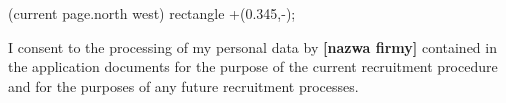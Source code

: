 \documentclass[9pt]{juniordevcv} %
\begin{document}
      (current page.north west) rectangle +(0.345\paperwidth,-\paperheight);
    \begin{minipage}[t]{.27\textwidth}
        
    \end{minipage}
    \hfill
    \begin{minipage}[t]{.67\textwidth}
        
    \end{minipage}

    \vspace{-26pt}
    \vspace{4pt}

    {\small%
        \noindent I consent to the processing of my personal data by 
        {\color{blue}\textbf{[nazwa firmy]}}
        contained in the application documents for the purpose of the current recruitment procedure and for the purposes of any future recruitment processes.
    }
    
\end{document}
